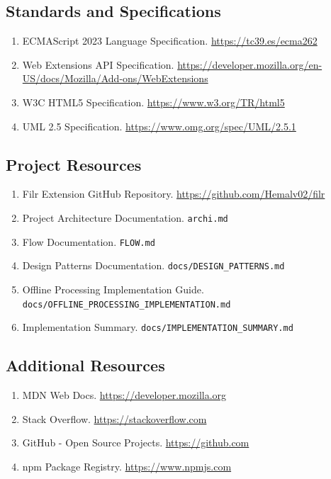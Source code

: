 \documentclass[11pt, a4paper]{article}
\theoremstyle{plain}
\theoremstyle{definition}
\begin{document}
\subsection{Standards and Specifications}

\begin{enumerate}
    \item ECMAScript 2023 Language Specification. \url{https://tc39.es/ecma262}
    
    \item Web Extensions API Specification. \url{https://developer.mozilla.org/en-US/docs/Mozilla/Add-ons/WebExtensions}
    
    \item W3C HTML5 Specification. \url{https://www.w3.org/TR/html5}
    
    \item UML 2.5 Specification. \url{https://www.omg.org/spec/UML/2.5.1}
\end{enumerate}

\subsection{Project Resources}

\begin{enumerate}
    \item Filr Extension GitHub Repository. \url{https://github.com/Hemalv02/filr}
    
    \item Project Architecture Documentation. \texttt{archi.md}
    
    \item Flow Documentation. \texttt{FLOW.md}
    
    \item Design Patterns Documentation. \texttt{docs/DESIGN\_PATTERNS.md}
    
    \item Offline Processing Implementation Guide. \texttt{docs/OFFLINE\_PROCESSING\_IMPLEMENTATION.md}
    
    \item Implementation Summary. \texttt{docs/IMPLEMENTATION\_SUMMARY.md}
\end{enumerate}

\subsection{Additional Resources}

\begin{enumerate}
    \item MDN Web Docs. \url{https://developer.mozilla.org}
    
    \item Stack Overflow. \url{https://stackoverflow.com}
    
    \item GitHub - Open Source Projects. \url{https://github.com}
    
    \item npm Package Registry. \url{https://www.npmjs.com}
\end{enumerate}
\end{document}
